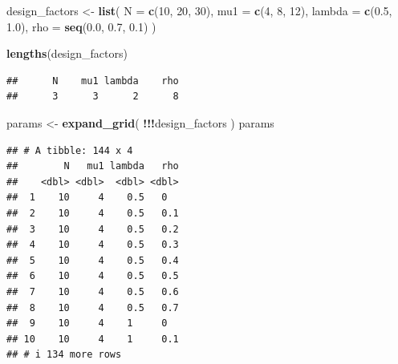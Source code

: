 \documentclass[
]{book}
\newenvironment{Shaded}{\begin{snugshade}}{\end{snugshade}}
\newcommand{\AttributeTok}[1]{\textcolor[rgb]{0.13,0.29,0.53}{#1}}
\newcommand{\DecValTok}[1]{\textcolor[rgb]{0.00,0.00,0.81}{#1}}
\newcommand{\FloatTok}[1]{\textcolor[rgb]{0.00,0.00,0.81}{#1}}
\newcommand{\FunctionTok}[1]{\textcolor[rgb]{0.13,0.29,0.53}{\textbf{#1}}}
\newcommand{\NormalTok}[1]{#1}
\newcommand{\OtherTok}[1]{\textcolor[rgb]{0.56,0.35,0.01}{#1}}
\newcommand{\SpecialCharTok}[1]{\textcolor[rgb]{0.81,0.36,0.00}{\textbf{#1}}}
\begin{document}
\begin{Shaded}
\begin{Highlighting}[]
\NormalTok{design\_factors }\OtherTok{\textless{}{-}} \FunctionTok{list}\NormalTok{(}
  \AttributeTok{N =} \FunctionTok{c}\NormalTok{(}\DecValTok{10}\NormalTok{, }\DecValTok{20}\NormalTok{, }\DecValTok{30}\NormalTok{),}
  \AttributeTok{mu1 =} \FunctionTok{c}\NormalTok{(}\DecValTok{4}\NormalTok{, }\DecValTok{8}\NormalTok{, }\DecValTok{12}\NormalTok{),}
  \AttributeTok{lambda =} \FunctionTok{c}\NormalTok{(}\FloatTok{0.5}\NormalTok{, }\FloatTok{1.0}\NormalTok{),}
  \AttributeTok{rho =} \FunctionTok{seq}\NormalTok{(}\FloatTok{0.0}\NormalTok{, }\FloatTok{0.7}\NormalTok{, }\FloatTok{0.1}\NormalTok{)}
\NormalTok{)}

\FunctionTok{lengths}\NormalTok{(design\_factors)}
\end{Highlighting}
\end{Shaded}

\begin{verbatim}
##      N    mu1 lambda    rho 
##      3      3      2      8
\end{verbatim}

\begin{Shaded}
\begin{Highlighting}[]
\NormalTok{params }\OtherTok{\textless{}{-}} \FunctionTok{expand\_grid}\NormalTok{( }\SpecialCharTok{!!!}\NormalTok{design\_factors )}
\NormalTok{params}
\end{Highlighting}
\end{Shaded}

\begin{verbatim}
## # A tibble: 144 x 4
##        N   mu1 lambda   rho
##    <dbl> <dbl>  <dbl> <dbl>
##  1    10     4    0.5   0  
##  2    10     4    0.5   0.1
##  3    10     4    0.5   0.2
##  4    10     4    0.5   0.3
##  5    10     4    0.5   0.4
##  6    10     4    0.5   0.5
##  7    10     4    0.5   0.6
##  8    10     4    0.5   0.7
##  9    10     4    1     0  
## 10    10     4    1     0.1
## # i 134 more rows
\end{verbatim}
\end{document}
